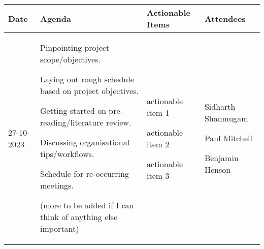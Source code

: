 \begin{table}[!h]
    \centering
    \begin{tabularx}{\textwidth}{|l|X|X|X|}
        \hline
        Date & Agenda & Actionable Items & Attendees \\
        \hline
        \hline
        27-10-2023 & 
        \begin{myitemize}
            \item Pinpointing project scope/objectives.
            \item Laying out rough schedule based on project objectives.
            \item Getting started on pre-reading/literature review.
            \item Discussing organisational tips/workflows.
            \item Schedule for re-occurring meetings.
            \item (more to be added if I can think of anything else important)
        \end{myitemize} & 
        \begin{myitemize}
            \item actionable item 1
            \item actionable item 2
            \item actionable item 3
        \end{myitemize} & 
        \begin{myitemize}
            \item Sidharth Shanmugam
            \item Paul Mitchell
            \item Benjamin Henson
        \end{myitemize} \\
        \hline
    \end{tabularx}
\end{table}
